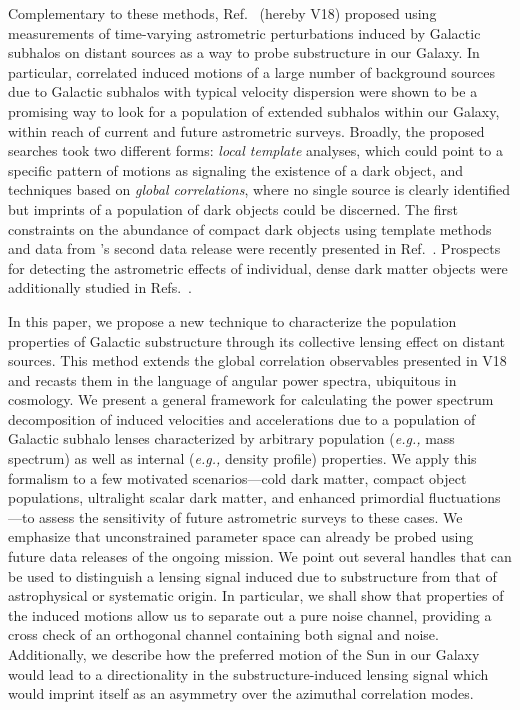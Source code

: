 \documentclass[prd,aps,twocolumn,nofootinbib,superscriptaddress,preprintnumbers,balancelastpage,longbibliography,floatfix]{revtex4-1}
\begin{document}
Complementary to these methods, Ref.~\cite{VanTilburg:2018ykj} (hereby V18) proposed using measurements of time-varying astrometric perturbations induced by Galactic subhalos on distant sources as a way to probe substructure in our Galaxy. In particular, correlated induced motions of a large number of background sources due to Galactic subhalos with typical velocity dispersion were shown to be a promising way to look for a population of extended subhalos within our Galaxy, within reach of current and future astrometric surveys. Broadly, the proposed searches took two different forms: {\em local template} analyses, which could point to a specific pattern of motions as signaling the existence of a dark object, and techniques based on {\em global correlations}, where no single source is clearly identified but imprints of a population of dark objects could be discerned. The first constraints on the abundance of compact dark objects using template methods and data from \Gaia's second data release were recently presented in Ref.~\cite{Mondino:2020rkn}. Prospects for detecting the astrometric effects of individual, dense dark matter objects were additionally studied in Refs.~\cite{Erickcek:2010fc,Li:2012qha,Zackrisson:2009rc}.

In this paper, we propose a new technique to characterize the population properties of Galactic substructure through its collective lensing effect on distant sources. This method extends the global correlation observables presented in V18 and recasts them in the language of angular power spectra, ubiquitous in cosmology. We present a general framework for calculating the power spectrum decomposition of induced velocities and accelerations due to a population of Galactic subhalo lenses characterized by arbitrary population (\emph{e.g.,} mass spectrum) as well as internal (\emph{e.g.,} density profile) properties. We apply this formalism to a few motivated scenarios---cold dark matter, compact object populations, ultralight scalar dark matter, and enhanced primordial fluctuations---to assess the sensitivity of future astrometric surveys to these cases. We emphasize that unconstrained parameter space can already be probed using future data releases of the ongoing \Gaia mission. We point out several handles that can be used to distinguish a lensing signal induced due to substructure from that of astrophysical or systematic origin. In particular, we shall show that properties of the induced motions allow us to separate out a pure noise channel, providing a cross check of an orthogonal channel containing both signal and noise. Additionally, we describe how the preferred motion of the Sun in our Galaxy would lead to a directionality in the substructure-induced lensing signal which would imprint itself as an asymmetry over the azimuthal correlation modes.
\end{document}
